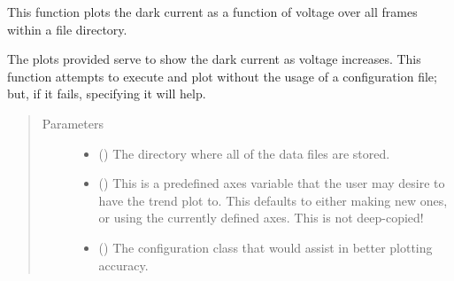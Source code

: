 \documentclass[letterpaper,10pt,english]{sphinxmanual}
\begin{document}
\begin{fulllineitems}
\label{\detokenize{python_docstrings/IfA_Smeargle.oscar.voltage_plots:IfA_Smeargle.oscar.voltage_plots.plotdir_dark_current_over_voltage}}
This function plots the dark current as a function of voltage over
all frames within a file directory.

The plots provided serve to show the dark current as voltage increases.
This function attempts to execute and plot without the usage of a
configuration file; but, if it fails, specifying it will help.
\begin{quote}\begin{description}
\item[{Parameters}] \leavevmode\begin{itemize}
\item {} 
 () \textendash{} The directory where all of the data files are stored.

\item {} 
 (\sphinxstyleliteralemphasis{\sphinxupquote{ (}}\sphinxstyleliteralemphasis{\sphinxupquote{)}}) \textendash{} This is a predefined axes variable that the user may desire to have
the trend plot to. This defaults to either making new ones, or
using the currently defined axes. This is not deep-copied!

\item {} 
 ({\hyperref[\detokenize{python_docstrings/IfA_Smeargle.yankee.yankee_main:IfA_Smeargle.yankee.yankee_main.SmeargleConfig}]{}}\sphinxstyleliteralemphasis{\sphinxupquote{ (}}\sphinxstyleliteralemphasis{\sphinxupquote{)}}) \textendash{} The configuration class that would assist in better plotting
accuracy.

\end{itemize}


\end{description}
\end{quote}
\end{fulllineitems}
\end{document}
